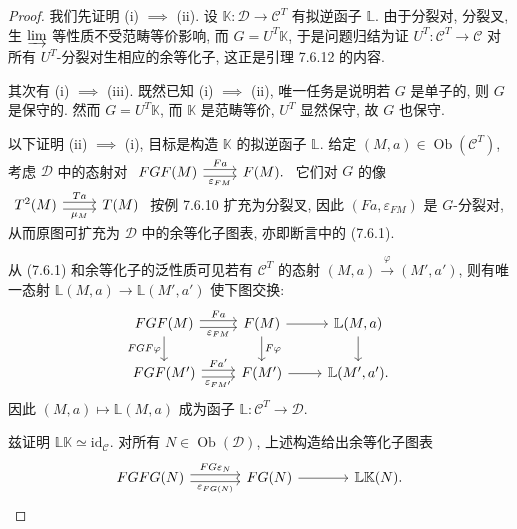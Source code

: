 \documentclass[11pt]{article}
\newcommand{\identity}{\mathrm{id}}
\newcommand{\Obj}{\operatorname{Ob}}
\theoremstyle{definition}
\begin{document}
\begin{proof}
	我们先证明 (i) $\implies$ (ii). 设 $\mathbb{K}: \mathcal{D} \to \mathcal{C}^T$ 有拟逆函子 $\mathbb{L}$. 由于分裂对, 分裂叉, 生 $\varinjlim$ 等性质不受范畴等价影响, 而 $G = U^T \mathbb{K}$, 于是问题归结为证 $U^T: \mathcal{C}^T \to \mathcal{C}$ 对所有 $U^T$-分裂对生相应的余等化子, 这正是引理 7.6.12 的内容.
	
	其次有 (i) $\implies$ (iii). 既然已知 (i) $\implies$ (ii), 唯一任务是说明若 $G$ 是单子的, 则 $G$ 是保守的. 然而 $G = U^T \mathbb{K}$, 而 $\mathbb{K}$ 是范畴等价, $U^T$ 显然保守, 故 $G$ 也保守.
	
	以下证明 (ii) $\implies$ (i), 目标是构造 $\mathbb{K}$ 的拟逆函子 $\mathbb{L}$. 给定 $(M, a) \in \Obj(\mathcal{C}^T)$, 考虑 $\mathcal{D}$ 中的态射对
	$\begin{tikzcd}
		FGF(M) \arrow[shift left, r, "Fa"] \arrow[shift right, r, "\varepsilon_{FM}"'] & F(M).
	\end{tikzcd}$
	它们对 $G$ 的像
	$\begin{tikzcd}
		T^2(M) \arrow[shift left, r, "Ta"] \arrow[shift right, r, "\mu_M"'] & T(M)
	\end{tikzcd}$\!
	按例 7.6.10 扩充为分裂叉, 因此 $(Fa, \varepsilon_{FM})$ 是 $G$-分裂对, 从而原图可扩充为 $\mathcal{D}$ 中的余等化子图表, 亦即断言中的 (7.6.1).
	
	从 (7.6.1) 和余等化子的泛性质可见若有 $\mathcal{C}^T$ 的态射 $(M, a) \xrightarrow{\varphi} (M', a')$, 则有唯一态射 $\mathbb{L}(M, a) \to \mathbb{L}(M', a')$ 使下图交换:
	\begin{equation*}\begin{tikzcd}
		FGF(M) \arrow[shift left, r, "Fa"] \arrow[shift right, r, "\varepsilon_{FM}"'] \arrow[d, "FGF\varphi"'] & F(M) \arrow[r] \arrow[d, "F\varphi"] & \mathbb{L}(M, a) \arrow[d] \\
		FGF(M') \arrow[shift left, r, "{Fa'}"] \arrow[shift right, r, "\varepsilon_{FM'}"'] & F(M') \arrow[r] & \mathbb{L}(M', a'). 
	\end{tikzcd}\end{equation*}
	因此 $(M, a) \mapsto \mathbb{L}(M, a)$ 成为函子 $\mathbb{L}: \mathcal{C}^T \to \mathcal{D}$.
	
	兹证明 $\mathbb{L}\mathbb{K} \simeq \identity_{\mathcal{C}}$. 对所有 $N \in \Obj(\mathcal{D})$, 上述构造给出余等化子图表
	\begin{equation*}\begin{tikzcd}[column sep=large]
		FGFG(N) \arrow[shift left, r, "FG\varepsilon_N"] \arrow[shift right, r, "\varepsilon_{FG(N)}"'] & FG(N) \arrow[r] & \mathbb{L}\mathbb{K}(N).
	\end{tikzcd}\end{equation*}


\end{proof}
\end{document}
